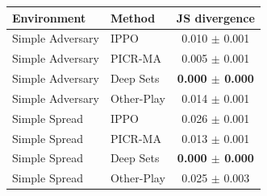 \begin{tabular}{llc}
\toprule
Environment & Method & JS divergence \\
\midrule
Simple Adversary & IPPO & 0.010 $\pm$ 0.001 \\
Simple Adversary & PICR-MA & 0.005 $\pm$ 0.001 \\
Simple Adversary & Deep Sets & \textbf{0.000 $\pm$ 0.000} \\
Simple Adversary & Other-Play & 0.014 $\pm$ 0.001 \\
Simple Spread & IPPO & 0.026 $\pm$ 0.001 \\
Simple Spread & PICR-MA & 0.013 $\pm$ 0.001 \\
Simple Spread & Deep Sets & \textbf{0.000 $\pm$ 0.000} \\
Simple Spread & Other-Play & 0.025 $\pm$ 0.003 \\
\bottomrule
\end{tabular}
